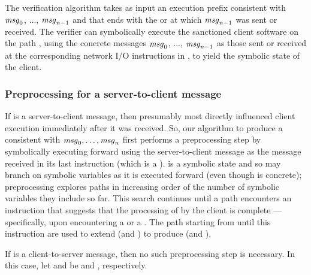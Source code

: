 The verification algorithm takes as input an execution prefix
 consistent with $\mathit{msg}_{0}$, $\ldots$,
$\mathit{msg}_{n-1}$ and that ends with the \sendInstr{} or
\recvInstr{} at which $\mathit{msg}_{n-1}$ was sent or received.
The verifier can symbolically execute the sanctioned client software
on the path , using the concrete messages
$\mathit{msg}_{0}$, $\ldots$, $\mathit{msg}_{n-1}$ as those sent or received at
the corresponding network I/O instructions in , to
yield the symbolic state  of the client.  

\subsubsection{Preprocessing for a server-to-client message} If
 is a server-to-client message, then presumably
 most directly influenced client execution immediately
after it was received.  So, our algorithm to produce a
\execPrefix{\msgNmbr} consistent with $\mathit{msg}_{0},\ldots,\mathit{msg}_{n}$
first performs a preprocessing step by symbolically executing
 forward using the server-to-client message
 as the message received in its last instruction
(which is a \recvInstr).   is a symbolic
state and so may branch on symbolic variables as it is executed
forward (even though
 is concrete); preprocessing explores paths in
increasing order of the number of symbolic variables they include so
far.  This search continues until a path encounters an instruction
that suggests that the processing of  by the client is
complete --- specifically, upon encountering a \selInstr or a
\sendInstr.  The path starting from  until
this instruction are used to extend
 (and ) to produce
 (and ).

If  is a client-to-server message, then no such
preprocessing step is necessary.  In this case, let
 and  be
 and , respectively.

